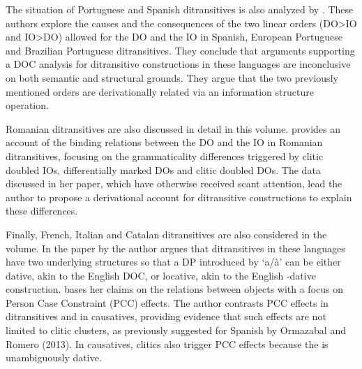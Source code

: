 \begin{styleListNumberi}
The situation of Portuguese and Spanish ditransitives is also analyzed by . These authors explore the causes and the consequences of the two linear orders (DO{\textgreater}IO and IO{\textgreater}DO) allowed for the DO and the IO in Spanish, European Portuguese and Brazilian Portuguese ditransitives. They conclude that arguments supporting a DOC analysis for ditransitive constructions in these languages are inconclusive on both semantic and structural grounds. They argue that the two previously mentioned orders are derivationally related via an information structure operation.
\end{styleListNumberi}

\begin{styleListNumberi}
Romanian ditransitives are also discussed in detail in this volume. provides an account of the binding relations between the DO and the IO in Romanian ditransitives, focusing on the grammaticality differences triggered by clitic doubled IOs, differentially marked DOs and clitic doubled DOs. The data discussed in her paper, which have otherwise received scant attention, lead the author to propose a derivational account for ditransitive constructions to explain these differences.
\end{styleListNumberi}

\begin{styleListNumberi}
Finally, French, Italian and Catalan ditransitives are also considered in the volume. In the paper by the author argues that ditransitives in these languages have two underlying structures so that a DP introduced by ‘a/à’ can be either dative, akin to the English DOC, or locative, akin to the English -dative construction. bases her claims on the relations between objects with a focus on Person Case Constraint (PCC) effects. The author contrasts PCC effects in ditransitives and in causatives, providing evidence that such effects are not limited to clitic clusters, as previously suggested for Spanish by Ormazabal and Romero (2013). In causatives, clitics also trigger PCC effects because the  is unambiguously dative.
\end{styleListNumberi}

